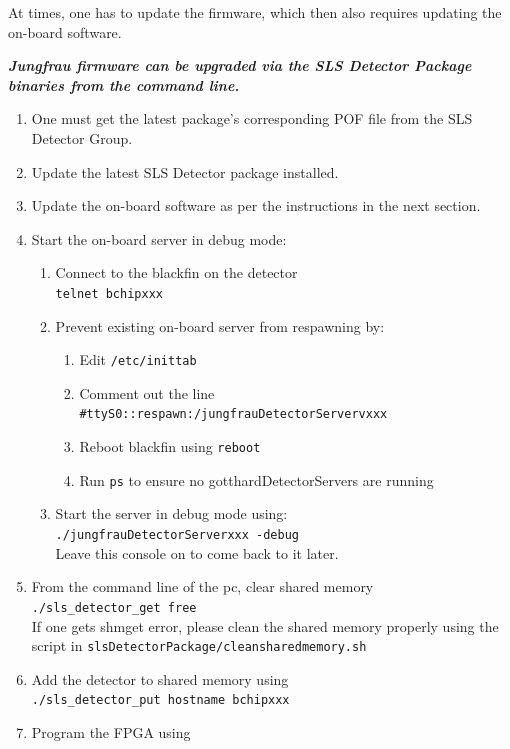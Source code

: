 \documentclass{article}
\begin{document}
At times, one has to update the firmware, which then also requires updating the
on-board software. 


\textbf{\textit{Jungfrau firmware can be upgraded via the SLS Detector Package
binaries from the command line.}}

\begin{enumerate}
  \item One must get the latest package's corresponding POF file from the SLS
Detector Group.
  \item Update the latest SLS Detector package installed.
  \item Update the on-board software as per the instructions in the next
section.
  \item Start the on-board server in debug mode:
  \begin{enumerate}
    \item Connect to the blackfin on the detector\\ 
\verb=telnet bchipxxx=
    \item Prevent existing on-board server from respawning by:
    \begin{enumerate}
      \item Edit \verb=/etc/inittab= 
      \item Comment out the line
\verb=#ttyS0::respawn:/jungfrauDetectorServervxxx= 
      \item Reboot blackfin using \verb=reboot=
      \item Run \verb=ps= to ensure no gotthardDetectorServers are running
    \end{enumerate}
    \item Start the server in debug mode using: \\
\verb=./jungfrauDetectorServerxxx -debug= \\
    Leave this console on to come back to it later.
  \end{enumerate}
  \item From the command line of the pc, clear shared memory \\
\verb=./sls_detector_get free= \\
  If one gets shmget error, please clean the shared memory properly using the
script in \verb=slsDetectorPackage/cleansharedmemory.sh=
  \item Add the detector to shared memory using \\
\verb=./sls_detector_put hostname bchipxxx=
  \item Program the FPGA using \\

\end{enumerate}
\end{document}
